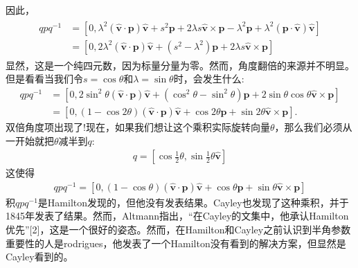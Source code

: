 因此，
\begin{align}
\begin{aligned}
q p q^{-1} & =\left[0, \lambda^{2}(\hat{\mathbf{v}} \cdot \mathbf{p}) \hat{\mathbf{v}}+s^{2} \mathbf{p}+2 \lambda s \hat{\mathbf{v}} \times \mathbf{p}-\lambda^{2} \mathbf{p}+\lambda^{2}(\mathbf{p} \cdot \hat{\mathbf{v}}) \hat{\mathbf{v}}\right] \\
& =\left[0,2 \lambda^{2}(\hat{\mathbf{v}} \cdot \mathbf{p}) \hat{\mathbf{v}}+\left(s^{2}-\lambda^{2}\right) \mathbf{p}+2 \lambda s \hat{\mathbf{v}} \times \mathbf{p}\right]
\end{aligned}
\end{align}
显然，这是一个纯四元数，因为标量分量为零。然而，角度翻倍的来源并不明显。但是看看当我们令$s=\cos \theta$和$\lambda=\sin \theta$时，会发生什么:
$$
\begin{aligned}
q p q^{-1} & =\left[0,2 \sin ^{2} \theta(\hat{\mathbf{v}} \cdot \mathbf{p}) \hat{\mathbf{v}}+\left(\cos ^{2} \theta-\sin ^{2} \theta\right) \mathbf{p}+2 \sin \theta \cos \theta \hat{\mathbf{v}} \times \mathbf{p}\right] \\
& =[0,(1-\cos 2 \theta)(\hat{\mathbf{v}} \cdot \mathbf{p}) \hat{\mathbf{v}}+\cos 2 \theta \mathbf{p}+\sin 2 \theta \hat{\mathbf{v}} \times \mathbf{p}] .
\end{aligned}
$$
双倍角度项出现了!现在，如果我们想让这个乘积实际旋转向量$\theta$，那么我们必须从一开始就把$\theta$减半到$q$:
\begin{align}
    q=\left[\cos \frac{1}{2} \theta, \sin \frac{1}{2} \theta \hat{\mathbf{v}}\right]
\end{align}
这使得
\begin{align}
q p q^{-1}=[0,(1-\cos \theta)(\hat{\mathbf{v}} \cdot \mathbf{p}) \hat{\mathbf{v}}+\cos \theta \mathbf{p}+\sin \theta \hat{\mathbf{v}} \times \mathbf{p}]
\end{align}
积$q p q^{-1}$是Hamilton发现的，但他没有发表结果。Cayley也发现了这种乘积，并于1845年发表了结果。然而，Altmann指出，“在Cayley的文集中，他承认Hamilton优先”[2]，这是一个很好的姿态。然而，在Hamilton和Cayley之前认识到半角参数重要性的人是rodrigues，他发表了一个Hamilton没有看到的解决方案，但显然是Cayley看到的。

